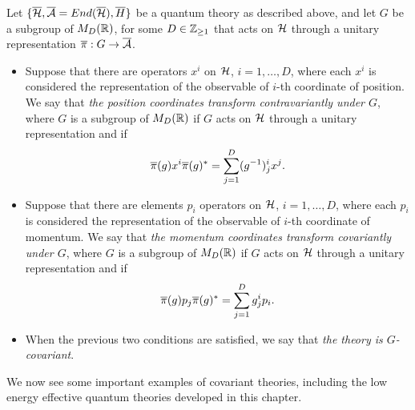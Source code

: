 \begin{definition}\label{definitionGActsCovariantlyOnCoordinates}
Let $\{\overline{\mathcal H}, \overline{\mathcal A} = End(\overline{\mathcal H}), \overline{H}\}$ be a quantum theory as described above, and let $G$ be a subgroup of $M_D(\mathbb{R})$, for some $D \in \mathbb{Z}_{\geq 1}$ that acts on $\mathcal H$ through a unitary representation $\overline{\pi}: G \to \overline{\mathcal A}$.
    \begin{itemize}
        
        \item Suppose that there are operators $x^i$ on $\mathcal H$, $i = 1, \dots, D$, where each $x^i$ is considered the representation of the observable of $i$-th coordinate of position. We say that \emph{the position coordinates transform contravariantly under $G$}, where $G$ is a subgroup of $M_D(\mathbb{R})$ if $G$ acts on $\mathcal H$ through a unitary representation and if 
        \begin{equation}
            \overline{\pi}(g) x^i \overline{\pi}(g)^* = \sum_{j = 1}^D (g^{-1})^i_j x^j.
        \end{equation}
        
        \item Suppose that there are elements $p_i$ operators on $\mathcal H$, $i = 1, \dots, D$, where each $p_i$ is considered the representation of the observable of $i$-th coordinate of momentum. We say that \emph{the momentum coordinates transform covariantly under $G$}, where $G$ is a subgroup of $M_D(\mathbb{R})$ if $G$ acts on $\mathcal H$ through a unitary representation  and if 
        \begin{equation}
            \overline{\pi}(g) p_j \overline{\pi}(g)^* = \sum_{j = 1}^D g^i_j p_i.
        \end{equation}
    
    \item When the previous two conditions are satisfied, we say that \emph{the theory is $G$-covariant}.
    
    \end{itemize}
    \end{definition}

We now see some important examples of covariant theories, including the low energy effective quantum theories developed in this chapter.


